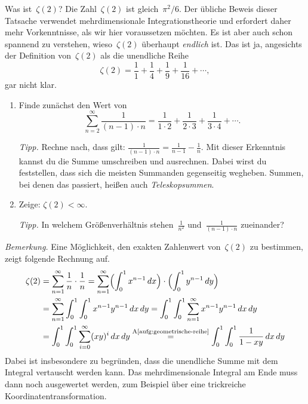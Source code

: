 \documentclass[twoside]{../zirkelblatt1415}
\theoremstyle{definition}
\theoremstyle{plain}
\theoremstyle{remark}
\begin{document}
\begin{aufgabe}{Was ist~$\zeta(2)$?}\label{aufg:zeta2}
Die Zahl~$\zeta(2)$ ist gleich~$\pi^2/6$. Der übliche Beweis dieser Tatsache
verwendet mehrdimensionale Integrationstheorie und erfordert daher mehr
Vorkenntnisse, als wir hier voraussetzen möchten. Es ist aber auch schon spannend
zu verstehen, wieso~$\zeta(2)$ überhaupt \emph{endlich} ist. Das ist ja,
angesichts der Definition von~$\zeta(2)$ als die unendliche Reihe
\[ \zeta(2) = \frac{1}{1} + \frac{1}{4} + \frac{1}{9} + \frac{1}{16} + \cdots,
\]
gar nicht klar.
\begin{enumerate}
\item Finde zunächst den Wert von
\[ \sum_{n=2}^\infty \frac{1}{(n-1) \cdot n} =
  \frac{1}{1 \cdot 2} + \frac{1}{2 \cdot 3} + \frac{1}{3 \cdot 4} + \cdots. \]

\emph{Tipp.} Rechne nach, dass gilt: $\frac{1}{(n-1) \cdot n} = \frac{1}{n-1} -
\frac{1}{n}$. Mit dieser Erkenntnis kannst du die Summe umschreiben und
ausrechnen. Dabei wirst du feststellen, dass sich die meisten Summanden
gegenseitig wegheben. Summen, bei denen das passiert, heißen auch
\emph{Teleskopsummen}.

\item Zeige: $\zeta(2) < \infty$.

\emph{Tipp.} In welchem Größenverhältnis stehen~$\frac{1}{n^2}$
und~$\frac{1}{(n-1) \cdot n}$ zueinander?
\end{enumerate}

\emph{Bemerkung.} Eine Möglichkeit, den exakten Zahlenwert von~$\zeta(2)$ zu
bestimmen, zeigt folgende Rechnung auf.
\begin{align*}
  \zeta(2) &=
  \sum_{n=1}^\infty \frac{1}{n} \cdot \frac{1}{n} =
  \sum_{n=1}^\infty \Bigl(\int_0^1 x^{n-1} \,dx\Bigr) \cdot
    \Bigl(\int_0^1 y^{n-1} \,dy\Bigr) \\
  &=
  \sum_{n=1}^\infty \int_0^1 \int_0^1 x^{n-1} y^{n-1} \,dx\,dy
  = \int_0^1 \int_0^1 \sum_{n=1}^\infty x^{n-1} y^{n-1} \,dx\,dy \\
  &= \int_0^1 \int_0^1 \sum_{i=0}^\infty (xy)^i \,dx\,dy
  \stackrel{\text{A\ref{aufg:geometrische-reihe}}}{=} \int_0^1 \int_0^1 \frac{1}{1 - xy} \,dx\,dy
\end{align*}
Dabei ist insbesondere zu begründen, dass die unendliche Summe mit dem Integral
vertauscht werden kann. Das mehrdimensionale Integral am Ende muss
dann noch ausgewertet werden, zum Beispiel über eine trickreiche
Koordinatentransformation.
\end{aufgabe}
\end{document}
